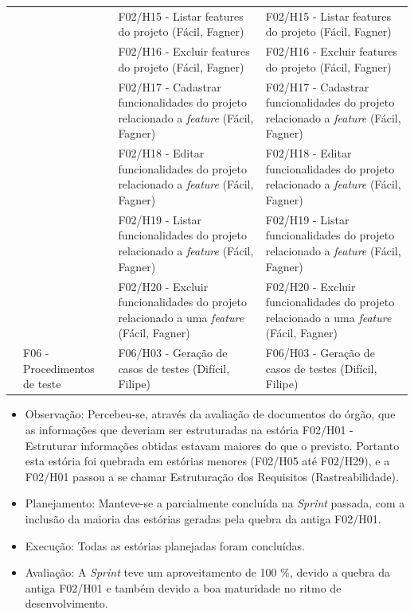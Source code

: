 \begin{table}[!htb]
\begin{tabular}{|M{1.8cm}|M{2.7cm}|M{6.4cm}|M{6.4cm}|}
 &  & F02/H15 - Listar features do projeto (Fácil, Fagner) & F02/H15 - Listar features do projeto (Fácil, Fagner)
\\ 
 &  & F02/H16 - Excluir features do projeto (Fácil, Fagner) & F02/H16 - Excluir features do projeto (Fácil, Fagner)
\\ 
 &  & F02/H17 - Cadastrar funcionalidades do projeto relacionado a \textit{feature} (Fácil, Fagner) & F02/H17 - Cadastrar funcionalidades do projeto relacionado a \textit{feature} (Fácil, Fagner)
\\ 
 &  & F02/H18 - Editar funcionalidades do projeto relacionado a \textit{feature} (Fácil, Fagner) & F02/H18 - Editar funcionalidades do projeto relacionado a \textit{feature} (Fácil, Fagner)
\\ 
 &  & F02/H19 - Listar funcionalidades do projeto relacionado a \textit{feature} (Fácil, Fagner) & F02/H19 - Listar funcionalidades do projeto relacionado a \textit{feature} (Fácil, Fagner)
\\ 
 &  & F02/H20 - Excluir funcionalidades do projeto relacionado a uma \textit{feature} (Fácil, Fagner) & F02/H20 - Excluir funcionalidades do projeto relacionado a uma \textit{feature} (Fácil, Fagner)
\\ 
 & F06 - Procedimentos de teste & F06/H03 - Geração de casos de testes (Difícil, Filipe) & F06/H03 - Geração de casos de testes (Difícil, Filipe)
\\ \hline
\end{tabular}
\label{tabela_10}
\end{table}
\clearpage

\clearpage

\begin{itemize}
\item Observação: Percebeu-se, através da avaliação de documentos do órgão, que as informações que deveriam ser estruturadas na estória F02/H01 - Estruturar informações obtidas estavam maiores do que o previsto. Portanto esta estória foi quebrada em estórias menores (F02/H05 até F02/H29), e a F02/H01 passou a se chamar Estruturação dos Requisitos (Rastreabilidade).
\item Planejamento: Manteve-se a parcialmente concluída na \textit{Sprint} passada, com a inclusão da maioria das estórias geradas pela quebra da antiga F02/H01.
\item Execução: Todas as estórias planejadas foram concluídas.
\item Avaliação: A \textit{Sprint} teve um aproveitamento de 100 \%, devido a quebra da antiga F02/H01 e também devido a boa maturidade no ritmo de desenvolvimento.
\end{itemize}
\clearpage

